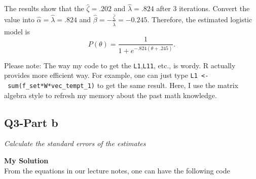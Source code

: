 \documentclass[
]{article}
\begin{document}
The results show that the \(\hat{\zeta}=.202\) and
\(\hat{\lambda}=.824\) after 3 iterations. Convert the value into
\(\hat{\alpha} = \hat{\lambda}=.824\) and
\(\hat{\beta} = -\frac{\hat{\zeta}}{\hat{\lambda}}=-0.245\). Therefore,
the estimated logistic model is
\[P(\theta)=\frac{1}{1+e^{-.824(\theta+.245)}}.\]

Please note: The way my code to get the \texttt{L1},\texttt{L11}, etc.,
is wordy. R actually provides more efficient way. For example, one can
just type \texttt{L1\ \textless{}-\ sum(f\_set*W*vec\_tempt\_1)} to get
the same result. Here, I use the matrix algebra style to refresh my
memory about the past math knowledge.

\hypertarget{q3-part-b}{%
\subsection{Q3-Part b}\label{q3-part-b}}

\emph{Calculate the standard errors of the estimates}

\textbf{My Solution}\\
From the equations in our lecture notes, one can have the following code
\end{document}
